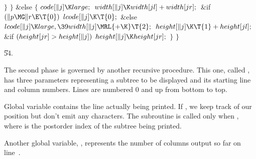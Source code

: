 \4${}\}{}$\2\6
\4${}\}{}$\2\6
\&{else}\5
${}\{{}$\1\6
${}\\{code}[\|j]\K\\{large};{}$\6
${}\\{width}[\|j]\K\\{width}[\\{jl}]+\\{width}[\\{jr}];{}$\6
\&{if} ${}(\|p\MG\|r\E\T{0}){}$\1\5
${}\\{lcode}[\|j]\K\T{0};{}$\2\6
\&{else}\1\5
${}\\{lcode}[\|j]\K\\{large},\39\\{width}[\|j]\MRL{+{\K}}\T{2};{}$\2\6
${}\\{height}[\|j]\K\T{1}+\\{height}[\\{jl}];{}$\6
\&{if} ${}(\\{height}[\\{jr}]>\\{height}[\|j]){}$\1\5
${}\\{height}[\|j]\K\\{height}[\\{jr}];{}$\2\6
\4${}\}{}$\2\6
\4${}\}{}$\2\par
\U54.\fi

The second phase is governed by another recursive procedure. This
one, called , has three parameters representing a subtree
to be displayed and its starting line and column numbers. Lines are
numbered 0 and up from bottom to top.

Global variable  contains the line actually being printed. If ,
we keep track of our position but don't emit any characters. The
subroutine is called only when , where  is the
postorder index of the subtree being printed.

Another global variable, , represents the number of columns output
so far on line~.

